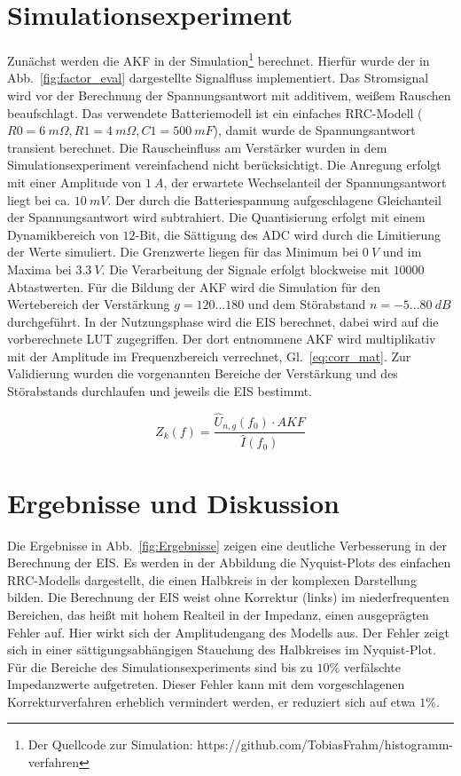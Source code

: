 \smallskip
\section{Simulationsexperiment}
Zunächst werden die AKF in der Simulation\footnote[2]{Der Quellcode zur Simulation: https://github.com/TobiasFrahm/histogramm-verfahren} berechnet. Hierfür wurde der in Abb.~\ref{fig:factor_eval} dargestellte Signalfluss implementiert. Das Stromsignal wird vor der Berechnung der Spannungsantwort mit additivem, weißem Rauschen beaufschlagt. Das verwendete Batteriemodell ist ein einfaches RRC-Modell ($R0 = \SI{6}{m\Omega}, R1=\SI{4}{m\Omega}, C1=\SI{500}{mF}$), damit wurde de Spannungsantwort transient berechnet. Die Rauscheinfluss am Verstärker wurden in dem Simulationsexperiment vereinfachend nicht berücksichtigt. Die Anregung erfolgt mit einer Amplitude von $\SI{1}{A}$, der erwartete Wechselanteil der Spannungsantwort liegt bei ca. $\SI{10}{mV}$. Der durch die Batteriespannung aufgeschlagene Gleichanteil der Spannungsantwort wird subtrahiert. Die Quantisierung erfolgt mit einem Dynamikbereich von $12$-Bit, die Sättigung des ADC wird durch die Limitierung der Werte simuliert. Die Grenzwerte liegen für das Minimum bei $\SI{0}{V}$ und im Maxima bei $\SI{3.3}{V}$. Die Verarbeitung der Signale erfolgt blockweise mit $10000$ Abtastwerten. Für die Bildung der AKF wird die Simulation für den Wertebereich der Verstärkung $g = 120 ... 180$ und dem Störabstand $n = -5 ... \SI{80}{dB}$ durchgeführt. In der Nutzungsphase wird die EIS berechnet, dabei wird auf die vorberechnete LUT zugegriffen. Der dort entnommene AKF wird multiplikativ mit der Amplitude im Frequenzbereich verrechnet, Gl.~\eqref{eq:corr_mat}. Zur Validierung wurden die vorgenannten Bereiche der Verstärkung und des Störabstands durchlaufen und jeweils die EIS bestimmt.

\begin{equation}
	\label{eq:corr_mat}
	Z_k(f) = \frac{\hat{U}_{n,g}(f_0) \cdot AKF}{\hat{I}(f_0)}
\end{equation}	


\section{Ergebnisse und Diskussion}
Die Ergebnisse in Abb.~\ref{fig:Ergebnisse} zeigen eine deutliche Verbesserung in der Berechnung der EIS. Es werden in der Abbildung die Nyquist-Plots des einfachen RRC-Modells dargestellt, die einen Halbkreis in der komplexen Darstellung bilden. 
Die Berechnung der EIS weist ohne Korrektur (links) im niederfrequenten Bereichen, das heißt mit hohem Realteil in der Impedanz, einen ausgeprägten Fehler auf. Hier wirkt sich der Amplitudengang des Modells aus. Der Fehler zeigt sich in einer sättigungsabhängigen Stauchung des Halbkreises im Nyquist-Plot. Für die Bereiche des Simulationsexperiments sind bis zu $10\%$ verfälschte Impedanzwerte aufgetreten. Dieser Fehler kann mit dem vorgeschlagenen Korrekturverfahren erheblich vermindert werden, er reduziert sich auf etwa $1\%$. 

